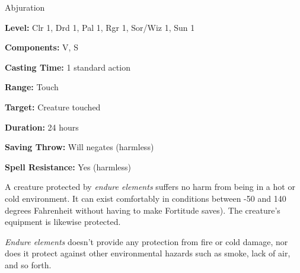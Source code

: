 
Abjuration

\textbf{Level:} Clr 1, Drd 1, Pal 1, Rgr 1, Sor/Wiz 1, Sun 1

\textbf{Components:} V, S

\textbf{Casting Time:} 1 standard action

\textbf{Range:} Touch

\textbf{Target:} Creature touched

\textbf{Duration:} 24 hours

\textbf{Saving Throw:} Will negates (harmless)

\textbf{Spell Resistance:} Yes (harmless)

A creature protected by \textit{endure elements} suffers no harm from being in 
a hot or cold environment. It can exist comfortably in conditions between -50 and 
140 degrees Fahrenheit without having to make Fortitude saves). The creature's 
equipment is likewise protected.

\textit{Endure elements} doesn't provide any protection from fire or cold damage, 
nor does it protect against other environmental hazards such as smoke, lack of 
air, and so forth.


